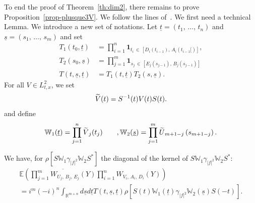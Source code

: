 \documentclass[AHL, Unicode, longabstracts,published]{cedram}
\newcommand{\R}{\mathbb{R}}
\newcommand{\E}{\mathbb{E}}
\newcommand{\bbW}{\mathbb{W}}
\newcommand{\bfun}{\mathbf{1}}
\let\oldtilde\tilde
\renewcommand*{\tilde}[1]{\mathchoice{\widetilde{#1}}{\widetilde{#1}}{\oldtilde{#1}}{\oldtilde{#1}}}
\begin{document}
To end the proof of Theorem~\ref{th:dim2}, there remains to prove Proposition~\ref{prop-plusque3V}. We follow the lines of~\cite{FLLS}. We first need a technical Lemma. We introduce a new set of notations. Let $\underline t=(t_1,\,\dots,\,t_n)$ and $ \underline s=(s_1,\,\dots,\,s_m)$ and set
\begin{align*}
T_1(t_0,\underline t) &= \prod_{i=1}^n \bfun_{t_i\,\in\, \left[D_i\left(t_{i-1}\right),\,A_i\left(t_{i-1}[\right)\right]}, \\
 T_2(s_0,\underline s) &= \prod_{j=1}^m \bfun_{s_j\,\in\, \left[E_j\left(s_{j-1}\right),\,B_j\left(s_{j-1}\right)\right]} \\
 T(t,\underline s,\underline t) &= T_1(t,\underline t)T_2(s,\underline s).
\end{align*}
For all $V \in L^2_{t,x}$, we set
\[
\tilde V (t)= S^{-1}(t) V(t) S(t).
\]
and define
\[
\bbW_1(\underline t) =\prod_{j=1}^n \tilde V_j(t_{j}) \qquad, \bbW_2(\underline s) =\prod_{j=1}^m \tilde U_{m+1-j}\left(s_{m+1-j}\right).
\]

\begin{lemm}\label{lem:comput}
We have, for $\rho \left[S \bbW_1 \gamma_{|f|^2} \bbW_2S^* \right]$ the diagonal of the kernel of $S \bbW_1 \gamma_{|f|^2} \bbW_2S^*$:
\begin{multline*}
\E \left(\overline{\prod_{j=1}^m W_{U_j,\,B_j,\,E_j} (Y)} \prod_{i=1}^n W_{V_i,\,A_i,\,D_i}(Y)\right)\\
 = i^m(-i)^n \int_{\R^{m+n}} d\underline s d\underline t T(t,\underline s,\underline t)\rho \left[S(t) \bbW_1(\underline t) \gamma_{|f|^2} \bbW_2(\underline s)S(-t) \right].
\end{multline*}
\end{lemm}
\end{document}
